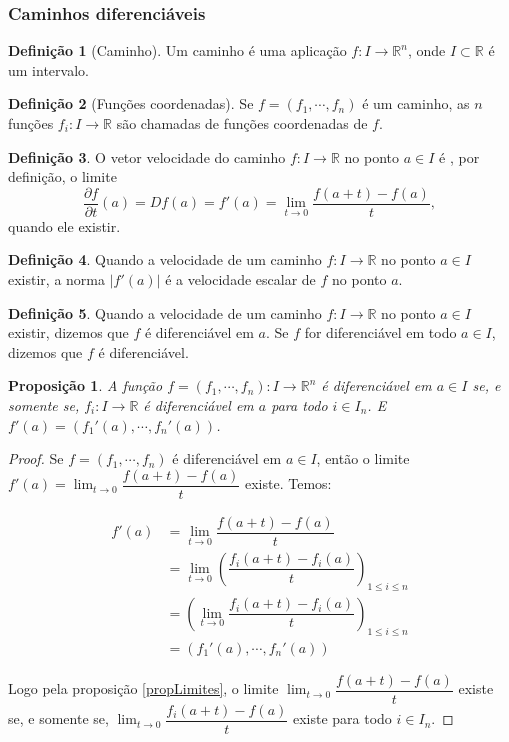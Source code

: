 \documentclass{article}
\newtheorem{prop}{Proposição}[section]
\theoremstyle{theorem}
\theoremstyle{lemma}
\theoremstyle{definition}
\newtheorem{definicao}{Definição}[section]
\theoremstyle{remark}
\begin{document}
   \subsubsection{ Caminhos diferenciáveis}
   \begin{definicao}[Caminho]
	   Um caminho é uma aplicação $f: I \to \mathbb{R}^n$, onde $I \subset\mathbb{R}$ é um intervalo.
   \end{definicao}
   \begin{definicao}[Funções coordenadas]
	Se $f = (f_1,\cdots, f_n)$ é um caminho, as $n$ funções $f_i : I \to \mathbb{R}$ são chamadas de funções coordenadas de $f$.
   \end{definicao}
   \begin{definicao}
	   O vetor velocidade do caminho $f:I\to \mathbb{R}$ no ponto $a\in I$ é , por definição, o limite \[ \dfrac{\partial f}{\partial t}(a) = Df(a) = f'(a) = \lim_{t\to 0} \dfrac{f(a+t) - f(a)}{t},\]
	   quando ele existir. 
   \end{definicao}
   \begin{definicao}
	   Quando a velocidade de um caminho $f:I\to \mathbb{R}$ no ponto $a\in I$ existir, a norma $|f'(a)|$ é a velocidade escalar de $f$ no ponto $a$.
   \end{definicao}
   \begin{definicao}
	   Quando a velocidade de um caminho $f:I\to \mathbb{R}$ no ponto $a\in I$ existir, dizemos que $f$ é diferenciável em $a$. Se $f$ for diferenciável em todo $a\in I$, dizemos que $f$ é diferenciável.
   \end{definicao}
   \begin{prop}
	   A função $f = (f_1,\cdots, f_n) : I \to \mathbb{R}^n$ é diferenciável em $a\in I$ se, e somente se, $f_i : I \to \mathbb{R}$ é diferenciável em $a$ para todo $i\in I_n$.  E $f'(a) = ( f_1'(a), \cdots, f_n'(a))$.
   \end{prop}
   \begin{proof}
	   Se $f = (f_1,\cdots, f_n)$ é diferenciável em $a\in I$, então o limite $f'(a) = \displaystyle\lim_{t\to 0} \dfrac{f(a+t) - f(a)}{t}$ existe. Temos:

	   \begin{align*}
		   f'(a) &= \lim_{t\to 0} \dfrac{f(a+t) - f(a)}{t} \\
		   &= \lim_{t \to 0} \left( \dfrac{f_i(a+t) - f_i(a)}{t}\right)_{1\leq i \leq n}\\
		   &=  \left(\lim_{t \to 0} \dfrac{f_i(a+t) - f_i(a)}{t}\right)_{1\leq i \leq n}\\
		   &=(f_1'(a),\cdots, f_n'(a))
	   \end{align*}

	   Logo pela proposição \ref{propLimites}, o limite  \(\displaystyle\lim_{t\to 0} \dfrac{f(a+t) - f(a)}{t}\) existe se, e somente se, \(\displaystyle\lim_{t\to 0} \dfrac{f_i(a+t) - f(a)}{t}\) existe para todo \(i\in I_n\).
   \end{proof}
\end{document}
